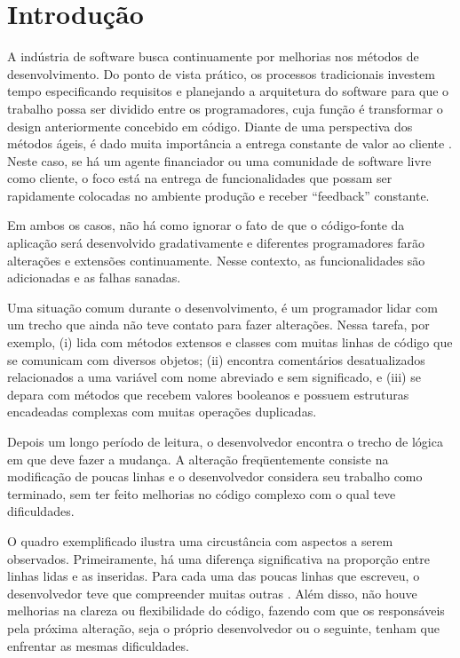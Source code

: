 \chapter{Introdução}
\label{chap:introducao}

A indústria de software busca continuamente por melhorias nos métodos
de desenvolvimento. Do ponto de vista prático, os processos tradicionais investem tempo especificando requisitos
e planejando a arquitetura do software para que o trabalho possa ser dividido entre os
programadores, cuja função é transformar o design anteriormente concebido em código.
Diante de uma perspectiva dos métodos ágeis, é dado muita importância a entrega constante 
de valor ao cliente \citep{AgM2001}. Neste caso, se há um agente financiador ou uma comunidade de software livre
como cliente, o foco está na entrega de funcionalidades que possam ser rapidamente colocadas
no ambiente produção e receber ``feedback'' constante.

Em ambos os casos, não há como ignorar o fato de que o código-fonte da aplicação será
desenvolvido gradativamente e diferentes programadores farão alterações e extensões
continuamente. Nesse contexto, as funcionalidades são adicionadas e as falhas sanadas.

Uma situação comum durante o desenvolvimento, é um programador lidar com um trecho que
ainda não teve contato para fazer alterações. Nessa tarefa, por exemplo, (i) lida com métodos extensos e classes
com muitas linhas de código que se comunicam com diversos objetos; (ii) encontra comentários
desatualizados relacionados a uma variável com nome abreviado e sem significado, e (iii) se depara com métodos que
recebem valores booleanos e possuem estruturas encadeadas complexas com muitas operações duplicadas.

Depois um longo período de leitura, o desenvolvedor encontra o trecho de lógica em que deve 
fazer a mudança. A alteração freqüentemente consiste na modificação de poucas linhas e o 
desenvolvedor considera seu trabalho como terminado, sem ter feito melhorias no código complexo com o qual teve dificuldades.

O quadro exemplificado ilustra uma circustância com aspectos a serem observados.
Primeiramente, há uma diferença significativa na proporção entre linhas lidas e as inseridas.
Para cada uma das poucas linhas que escreveu, o desenvolvedor teve que compreender muitas
outras \citep{Beck2007}. Além disso, não houve melhorias na clareza ou flexibilidade do código, fazendo 
com que os responsáveis pela próxima alteração, seja o próprio desenvolvedor ou o seguinte,
tenham que enfrentar as mesmas dificuldades.

